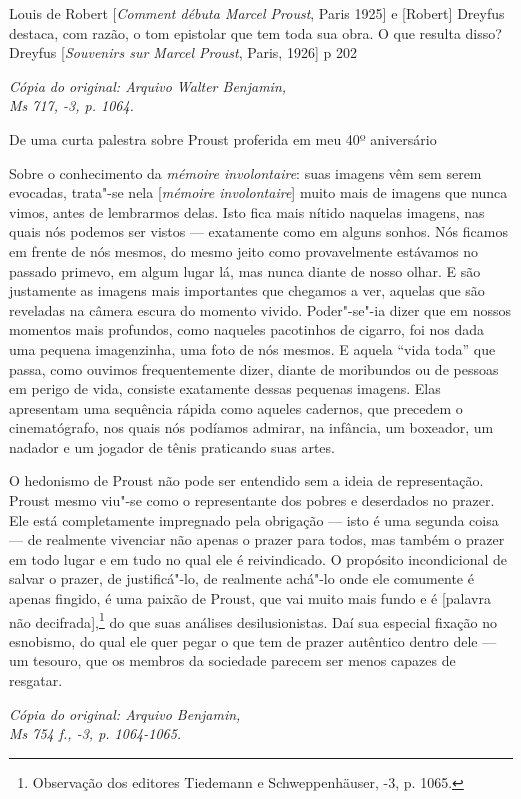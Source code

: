 Louis de Robert {[}\emph{Comment débuta Marcel Proust}, Paris 1925{]} e
{[}Robert{]} Dreyfus destaca, com razão, o tom epistolar que tem toda
sua obra. O que resulta disso? Dreyfus {[}\emph{Souvenirs sur Marcel
Proust}, Paris, 1926{]} p 202

\begin{flushright}
\emph{\footnotesize{Cópia do original: Arquivo Walter Benjamin,\\ Ms 717, -3, p. 1064.}}
\end{flushright}

De uma curta palestra sobre Proust proferida em meu 40º aniversário

Sobre o conhecimento da \emph{mémoire involontaire}: suas imagens vêm
sem serem evocadas, trata"-se nela {[}\emph{mémoire
involontaire}{]} muito mais de imagens que nunca vimos, antes de
lembrarmos delas. Isto fica mais nítido naquelas imagens, nas quais nós
podemos ser vistos --- exatamente como em alguns sonhos. Nós ficamos em
frente de nós mesmos, do mesmo jeito como provavelmente estávamos no
passado primevo, em algum lugar lá, mas nunca diante de nosso olhar. E
são justamente as imagens mais importantes que chegamos a ver, aquelas
que são reveladas na câmera escura do momento vivido. Poder"-se"-ia dizer
que em nossos momentos mais profundos, como naqueles pacotinhos de
cigarro, foi nos dada uma pequena imagenzinha, uma foto de nós mesmos. E
aquela ``vida toda'' que passa, como ouvimos frequentemente dizer,
diante de moribundos ou de pessoas em perigo de vida, consiste
exatamente dessas pequenas imagens. Elas apresentam uma sequência rápida
como aqueles cadernos, que precedem o cinematógrafo, nos quais nós
podíamos admirar, na infância, um boxeador, um nadador e um jogador de
tênis praticando suas artes.

O hedonismo de Proust não pode ser entendido sem a ideia de
representação. Proust mesmo viu"-se como o representante dos pobres e
deserdados no prazer. Ele está completamente impregnado pela obrigação
--- isto é uma segunda coisa --- de realmente vivenciar não apenas o
prazer para todos, mas também o prazer em todo lugar e em tudo no qual
ele é reivindicado. O propósito incondicional de salvar o prazer, de
justificá"-lo, de realmente achá"-lo onde ele comumente é apenas fingido,
é uma paixão de Proust, que vai muito mais fundo e é {[}palavra não
decifrada{]},\footnote{Observação dos editores Tiedemann e
  Schweppenhäuser, -3, p. 1065. \versal{[N. E.]}} do que suas análises
desilusionistas. Daí sua especial fixação no esnobismo, do qual ele quer
pegar o que tem de prazer autêntico dentro dele --- um tesouro, que os
membros da sociedade parecem ser menos capazes de resgatar.

\begin{flushright}
\emph{\footnotesize{Cópia do original: Arquivo Benjamin,\\ Ms 754 f., -3, p. 1064-1065.}} \enlargethispage{\baselineskip}
\end{flushright}
